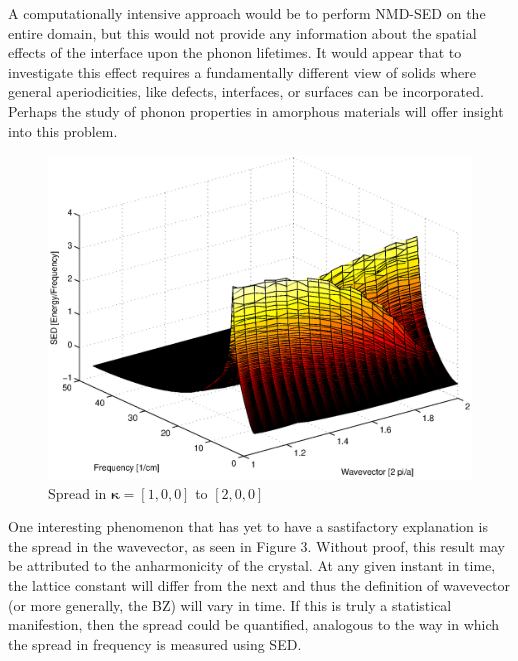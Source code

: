 \documentclass{article}
\begin{document}
A computationally intensive approach would be to perform NMD-SED on the entire domain, but this would not provide any information about the spatial effects of the interface upon the phonon lifetimes. It would appear that to investigate this effect requires a fundamentally different view of solids where general aperiodicities, like defects, interfaces, or surfaces can be incorporated. Perhaps the study of phonon properties in amorphous materials will offer insight into this problem.

\begin{figure}[ht]
\centering
\includegraphics[scale=0.7]{spread_100_200}
\caption{Spread in $\pmb{\kappa}=[1,0,0]$ to $[2,0,0]$ }
\end{figure}

One interesting phenomenon that has yet to have a sastifactory explanation is the spread in the wavevector, as seen in Figure 3. Without proof, this result may be attributed to the anharmonicity of the crystal. At any given instant in time, the lattice constant will differ from the next and thus the definition of wavevector (or more generally, the BZ) will vary in time. If this is truly a statistical manifestion, then the spread could be quantified, analogous to the way in which the spread in frequency is measured using SED.

\newpage


\end{document}
